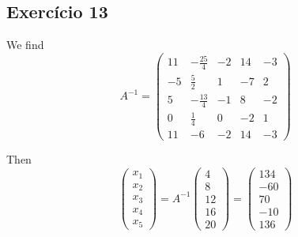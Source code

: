\subsection*{Exercício 13}

We find $$A^{-1} =
\begin{pmatrix}
  11 & -\frac{25}{4} & -2 & 14 & -3 \\
  -5 & \frac{5}{2} & 1 & -7 & 2 \\
  5 & -\frac{13}{4} & -1 & 8 & -2 \\
  0 & \frac{1}{4} & 0 & -2 & 1 \\
  11 & -6 & -2 & 14 & -3
\end{pmatrix}$$

Then
$$
\begin{pmatrix} x_1 \\ x_2 \\ x_3 \\ x_4 \\ x_5 \end{pmatrix} =
A^{-1} \begin{pmatrix} 4 \\ 8 \\ 12 \\ 16 \\ 20 \end{pmatrix} =
\begin{pmatrix} 134 \\ -60 \\ 70 \\ -10 \\ 136 \end{pmatrix}
$$
